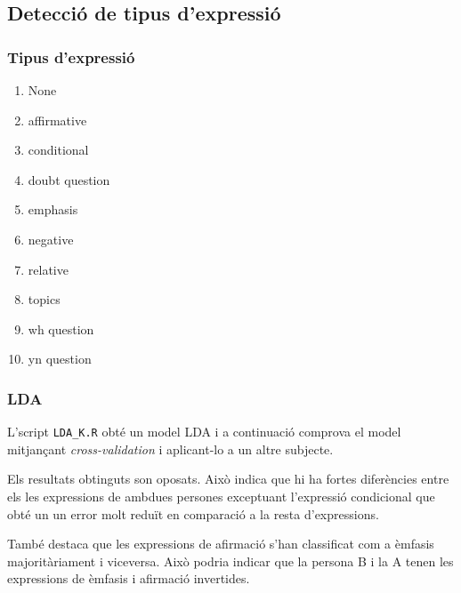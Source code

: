 \documentclass[a4paper]{article}
\begin{document}
\subsection{Detecció de tipus d'expressió}
\subsubsection{Tipus d'expressió}
\label{sec:tipus_expressio}
\begin{multicols}{3}
	\begin{enumerate}
		\item None 
		\item affirmative 
		\item conditional 
		\item doubt question 
		\item emphasis 
		\item negative 
		\item relative 
		\item topics 
		\item wh question 
		\item yn question
	\end{enumerate}
\end{multicols}

\subsubsection{LDA}

L'script \verb|LDA_K.R|  obté un model LDA i a continuació comprova el model mitjançant \emph{cross-validation} i aplicant-lo a un altre subjecte.

Els resultats obtinguts son oposats. Això indica que hi ha fortes diferències entre els les expressions de ambdues persones exceptuant l'expressió condicional que obté un un error molt reduït en comparació a la resta d'expressions.

També destaca que les expressions de afirmació s’han classificat com a èmfasis majoritàriament i viceversa. Això podria indicar que la persona B i la A tenen les expressions de èmfasis i afirmació invertides.
\end{document}
